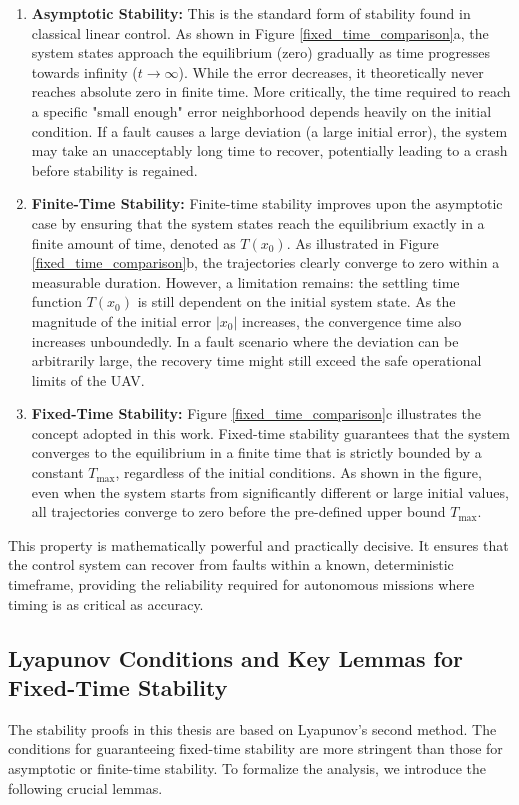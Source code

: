 \begin{enumerate}
    \item \textbf{Asymptotic Stability:} 
    This is the standard form of stability found in classical linear control. As shown in Figure \ref{fixed_time_comparison}a, the system states approach the equilibrium (zero) gradually as time progresses towards infinity ($t \to \infty$). While the error decreases, it theoretically never reaches absolute zero in finite time. More critically, the time required to reach a specific "small enough" error neighborhood depends heavily on the initial condition. If a fault causes a large deviation (a large initial error), the system may take an unacceptably long time to recover, potentially leading to a crash before stability is regained.

    \item \textbf{Finite-Time Stability: } 
    Finite-time stability improves upon the asymptotic case by ensuring that the system states reach the equilibrium exactly in a finite amount of time, denoted as $T(x_0)$. As illustrated in Figure \ref{fixed_time_comparison}b, the trajectories clearly converge to zero within a measurable duration. However, a limitation remains: the settling time function $T(x_0)$ is still dependent on the initial system state. As the magnitude of the initial error $|x_0|$ increases, the convergence time also increases unboundedly. In a fault scenario where the deviation can be arbitrarily large, the recovery time might still exceed the safe operational limits of the UAV.

    \item \textbf{Fixed-Time Stability:} 
    Figure \ref{fixed_time_comparison}c illustrates the concept adopted in this work. Fixed-time stability guarantees that the system converges to the equilibrium in a finite time that is strictly bounded by a constant $T_{\max}$, regardless of the initial conditions. As shown in the figure, even when the system starts from significantly different or large initial values, all trajectories converge to zero before the pre-defined upper bound $T_{\max}$.
\end{enumerate}

This property is mathematically powerful and practically decisive. It ensures that the control system can recover from faults within a known, deterministic timeframe, providing the reliability required for autonomous missions where timing is as critical as accuracy.

\subsection{Lyapunov Conditions and Key Lemmas for Fixed-Time Stability}
The stability proofs in this thesis are based on Lyapunov's second method. The conditions for guaranteeing fixed-time stability are more stringent than those for asymptotic or finite-time stability. To formalize the analysis, we introduce the following crucial lemmas.

